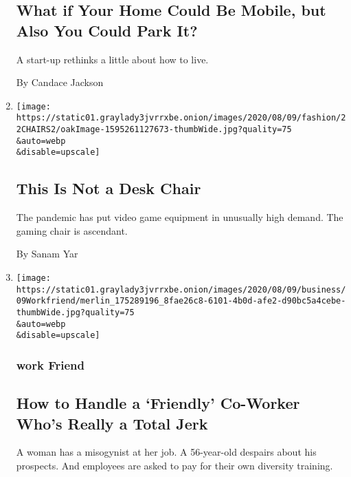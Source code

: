 \begin{enumerate}
  \hypertarget{what-if-your-home-could-be-mobile-but-also-you-could-park-it-1}{%
  \subsection{What if Your Home Could Be Mobile, but Also You Could Park
  It?}\label{what-if-your-home-could-be-mobile-but-also-you-could-park-it-1}}

  A start-up rethinks a little about how to live.

  By Candace Jackson
\item
  \href{/2020/08/07/style/gamer-chair-market-herman-miller.html}{}

  \texttt{[image: https://static01.graylady3jvrrxbe.onion/images/2020/08/09/fashion/22CHAIRS2/oakImage-1595261127673-thumbWide.jpg?quality=75\\\&auto=webp\\\&disable=upscale]}

  \hypertarget{this-is-not-a-desk-chair-1}{%
  \subsection{This Is Not a Desk
  Chair}\label{this-is-not-a-desk-chair-1}}

  The pandemic has put video game equipment in unusually high demand.
  The gaming chair is ascendant.

  By Sanam Yar
\item
  \href{/2020/08/07/business/how-to-handle-a-friendly-co-worker-whos-really-a-total-jerk.html}{}

  \texttt{[image: https://static01.graylady3jvrrxbe.onion/images/2020/08/09/business/09Workfriend/merlin\_175289196\_8fae26c8-6101-4b0d-afe2-d90bc5a4cebe-thumbWide.jpg?quality=75\\\&auto=webp\\\&disable=upscale]}

  \hypertarget{work-friend}{%
  \subsubsection{work Friend}\label{work-friend}}

  \hypertarget{how-to-handle-a-friendly-co-worker-whos-really-a-total-jerk}{%
  \subsection{How to Handle a `Friendly' Co-Worker Who's Really a Total
  Jerk}\label{how-to-handle-a-friendly-co-worker-whos-really-a-total-jerk}}

  A woman has a misogynist at her job. A 56-year-old despairs about his
  prospects. And employees are asked to pay for their own diversity
  training.


\end{enumerate}
